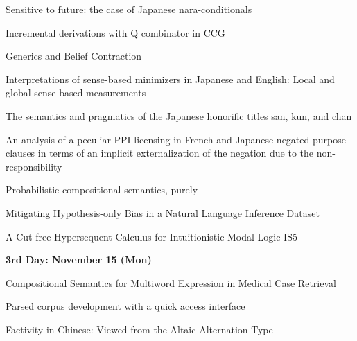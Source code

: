 \documentclass[12pt]{jarticle}
\begin{document}
  
      {Sensitive to future: the case of Japanese nara-conditionals}
      {}
  
      {Incremental derivations with Q combinator in CCG}
      {}
  
      {Generics and Belief Contraction}
      {}




  
      {Interpretations of sense-based minimizers in Japanese and English: Local and global sense-based measurements}
      {}
  
      {The semantics and pragmatics of the Japanese honorific titles san, kun, and chan}
      {}
  
      {An analysis of a peculiar PPI licensing in French and Japanese negated purpose clauses in terms of an implicit externalization of the negation due to the non-responsibility}
      {}




  
      {Probabilistic compositional semantics, purely}
      {}
  
      {Mitigating Hypothesis-only Bias in a Natural Language Inference Dataset}
      {}
  
      {A Cut-free Hypersequent Calculus for Intuitionistic Modal Logic IS5}
      {}




\noindent\textbf{\large 
3rd Day: November 15 (Mon)
}\\




  
      {Compositional Semantics for Multiword Expression in Medical Case Retrieval}
      {}
  
      {Parsed corpus development with a quick access interface}
      {}
  
      {Factivity in Chinese: Viewed from the Altaic Alternation Type}
      {}

  

\end{document}
